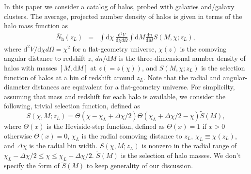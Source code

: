 \documentclass[onecolumn,notitlepage,showpacs,amsmath,amssymb,prd,floatfix]{revtex4-1}
\newcommand{\dr}{\mathrm{d}}
\newcommand{\bnh}{\frac{\dr n}{\dr M}}
\begin{document}
In this paper we consider a catalog of halos, probed with galaxies
and/galaxy clusters. The average, projected number density of halos is
given in terms of the halo mass function as
%
\begin{eqnarray}
\bar{N}_{\mathrm{h}}(z_L)&=&\int\!\dr\chi~\frac{\dr^2V}{\dr\chi
 d\Omega}\int\!\dr M\frac{\dr n}{\dr M}S(M, \chi;z_L),
\end{eqnarray}
%
where $\dr^2V/\dr\chi d\Omega=\chi^2$ for a flat-geometry universe,
$\chi(z)$ is the comoving angular distance to redshift $z$, $dn/\dr M$ is
the three-dimensional number density of halos with masses $[M,\dr M]$ at
$z(=z(\chi))$, and $S(M,\chi;z_L)$ is the selection function of halos at
a bin of redshift around $z_L$. Note that the radial and
angular-diameter distances are equivalent for a flat-geometry universe.
For simplicilty, assuming that mass and redshift for each halo is
available, we consider the following, trivial selection function,
defined as
%
\begin{equation}
 S(\chi,M;z_L)=\Theta(\chi-\chi_L+\Delta\chi/2)\Theta(\chi_L+\Delta\chi/2-\chi)
\tilde{S}(M),
\end{equation}
%
where $\Theta(x)$ is the Heviside-step function, defined as
$\Theta(x)=1$ if $x>0$ otherwise $\Theta(x)=0$, $\chi_L$ is the radial
comoving distance to $z_L$, $\chi_L\equiv \chi(z_L)$, and
$\Delta\chi$ is the radial bin width. $S(\chi,M;z_L)$ is nonzero in the
radial range of $\chi_L-\Delta\chi/2\le \chi\le \chi_L+\Delta\chi/2$.
$\tilde{S}(M)$ is the selection of halo masses. We don't specify the
form of $\tilde{S}(M)$ to keep generality of our discussion.
\end{document}
